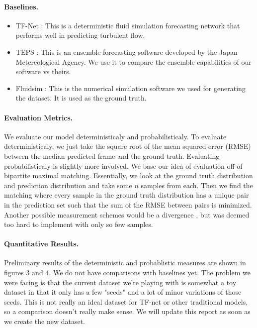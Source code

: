 \documentclass{article}
\begin{document}
    \paragraph{Baselines.}
    {
        \begin{itemize}
            \item TF-Net \cite{Wang2020TF}: This is a deterministic fluid simulation forecasting network that performs well in predicting turbulent flow.
            \item TEPS \cite{TyphoonEnsemblePredictionSystemDevelopedattheJapanMeteorologicalAgency}: This is an ensemble forecasting software developed by the Japan Metereological Agency. We use it to compare the ensemble capabilities of our software vs theirs.
            \item Fluidsim \cite{fluiddyn, fluidfft, fluidsim}: This is the numerical simulation software we used for generating the dataset. It is used as the ground truth.
        \end{itemize}
    }

    \paragraph{Evaluation Metrics.}
    We evaluate our model deterministicaly and probabilisticaly. To evaluate deterministicaly, we just take the square root of the mean squared error (RMSE) between the median predicted frame and the ground truth. Evaluating probabilisticaly is slightly more involved. We base our idea of evaluation off of bipartite maximal matching. Essentially, we look at the ground truth distribution and prediction distribution and take some $n$ samples from each. Then we find the matching where every sample in the ground truth distribution has a unique pair in the prediction set such that the sum of the RMSE between pairs is minimized. Another possible measurement schemes would be a divergence \cite{Joyce2011}, but was deemed too hard to implement with only so few samples.

    \paragraph{Quantitative Results.}
    Preliminary results of the deterministic and probablistic measures are shown in figures 3 and 4. We do not have comparisons with baselines yet. The problem we were facing is that the current dataset we're playing with is somewhat a toy dataset in that it only has a few "seeds" and a lot of minor variations of those seeds. This is not really an ideal dataset for TF-net or other traditional models, so a comparison doesn't really make sense. We will update this report as soon as we create the new dataset.
\end{document}
